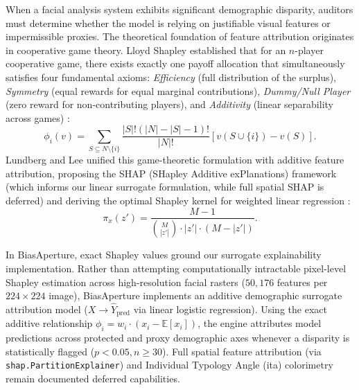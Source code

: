 When a facial analysis system exhibits significant demographic disparity, auditors must determine whether the model is relying on justifiable visual features or impermissible proxies. The theoretical foundation of feature attribution originates in cooperative game theory. Lloyd Shapley established that for an $n$-player cooperative game, there exists exactly one payoff allocation that simultaneously satisfies four fundamental axioms: \emph{Efficiency} (full distribution of the surplus), \emph{Symmetry} (equal rewards for equal marginal contributions), \emph{Dummy/Null Player} (zero reward for non-contributing players), and \emph{Additivity} (linear separability across games) \cite{shapley1953value}:
\begin{equation}
    \phi_i(v) = \sum_{S \subseteq N \setminus \{i\}} \frac{|S|!(|N| - |S| - 1)!}{|N|!} \left[ v(S \cup \{i\}) - v(S) \right].
\end{equation}
Lundberg and Lee unified this game-theoretic formulation with additive feature attribution, proposing the SHAP (SHapley Additive exPlanations) framework (which informs our linear surrogate formulation, while full spatial SHAP is deferred) and deriving the optimal Shapley kernel for weighted linear regression \cite{lundberg2017unified}:
\begin{equation}
    \pi_x(z') = \frac{M - 1}{\binom{M}{|z'|} \cdot |z'| \cdot (M - |z'|)}.
\end{equation}

In BiasAperture, exact Shapley values ground our surrogate explainability implementation. Rather than attempting computationally intractable pixel-level Shapley estimation across high-resolution facial rasters ($50,176$ features per $224 \times 224$ image), BiasAperture implements an additive demographic surrogate attribution model ($X \to \hat{Y}_{\text{pred}}$ via linear logistic regression). Using the exact additive relationship $\phi_i = w_i \cdot (x_i - \mathbb{E}[x_i])$, the engine attributes model predictions across protected and proxy demographic axes whenever a disparity is statistically flagged ($p < 0.05, n \ge 30$). Full spatial feature attribution (via \texttt{shap.PartitionExplainer}) and Individual Typology Angle (\gls{ita}) colorimetry remain documented deferred capabilities.


